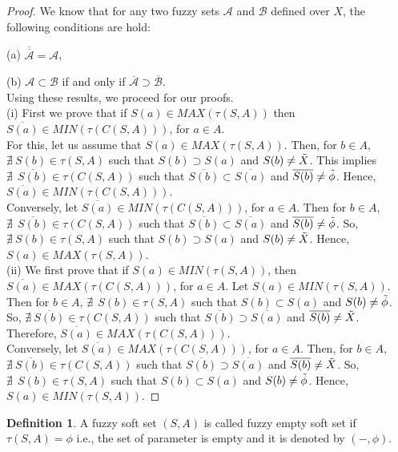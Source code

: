 \documentclass{article}
\theoremstyle{definition}
\newtheorem{definition}{Definition}[section]
\begin{document}
\begin{proof}

     We know that for any two fuzzy sets $\mathcal{A}$ and $\mathcal{B}$ defined over $X$, the following conditions are hold:

     (a) $\overline{\overline{\mathcal{A}}}= \mathcal{A}$,

     
     (b) $\mathcal{A} \subset \mathcal{B}$ if and only if $\overline{\mathcal{A}} \supset \overline{\mathcal{B}}$.\\

Using these results, we proceed for our proofs.\\


     (i) First we prove that if $S(a) \in MAX(\tau(S,A))$ then $\overline{S(a)} \in MIN(\tau (C(S,A)))$,  for $a\in A$.\\ 
     
     For this, let us assume that $S(a) \in MAX(\tau(S,A))$. Then, for $b\in A$, $\nexists ~S(b) \in \tau(S,A)$ such that $S(b)\supset S(a)$ and $S(b) \neq \Tilde{X}$. This implies $\nexists ~~\overline{S(b)} \in \tau(C(S,A))$ such that $\overline{S(b)}\subset \overline{S(a)}$ and $\overline{S(b)} \neq \Tilde{\phi}$. Hence, $\overline{S(a)} \in MIN(\tau (C(S,A)))$.\\

     Conversely, let $\overline{S(a)} \in MIN(\tau (C(S,A)))$, for $a\in A$. Then for $b\in A$, $\nexists ~~\overline{S(b)} \in \tau(C(S,A))$ such that $\overline{S(b)}\subset \overline{S(a)}$ and $\overline{S(b)} \neq \Tilde{\phi}$. So, $\nexists ~S(b) \in \tau(S,A)$ such that $S(b)\supset S(a)$ and $S(b) \neq \Tilde{X} $. Hence, $S(a) \in MAX(\tau(S,A))$.\\

     (ii) We first prove that if $S(a) \in MIN(\tau(S,A))$, then $\overline{S(a)} \in MAX(\tau (C(S,A)))$, for $a\in A$. Let $S(a) \in MIN(\tau (S,A))$. Then for $b\in A$, $\nexists ~~S(b) \in \tau(S,A)$ such that $S(b)\subset S(a)$ and $S(b) \neq \Tilde{\phi}$. So, $\nexists ~\overline{S(b)} \in \tau(C(S,A))$ such that $\overline{S(b)}\supset \overline{S(a)}$ and $\overline{S(b)} \neq \Tilde{X} $. Therefore, $\overline{S(a)} \in MAX(\tau(C(S,A)))$. \\

     Conversely, let $\overline{S(a)} \in MAX(\tau(C(S,A)))$, for $a\in A$.  Then, for $b\in A$, $\nexists ~\overline{S(b)} \in \tau(C(S,A))$ such that $\overline{S(b)}\supset \overline{S(a)}$ and $ \overline{S(b)} \neq \Tilde{X}$. So, $\nexists ~~S(b) \in \tau(S,A)$ such that $S(b)\subset S(a)$ and $S(b) \neq \Tilde{\phi}$. Hence, $S(a) \in MIN(\tau (S,A))$.
        
\end{proof}
\begin{definition}
    A fuzzy soft set $(S,A)$ is called fuzzy empty soft set if $\tau (S,A)= \phi$ i.e., the set of parameter is empty and it is denoted by $(-,\phi)$.
\end{definition}
\end{document}
